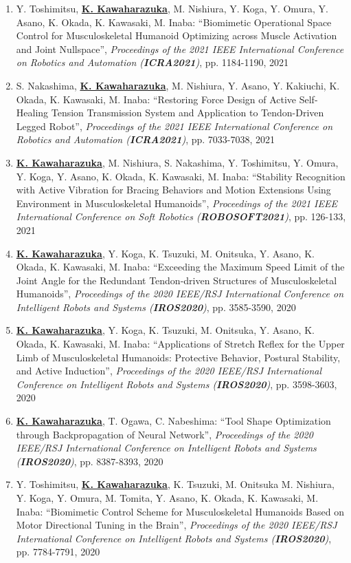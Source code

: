 \documentclass[letterpaper]{article}
\begin{document}
\begin{enumerate}
\item Y. Toshimitsu, \underline{\textbf{K. Kawaharazuka}}, M. Nishiura, Y. Koga, Y. Omura, Y. Asano, K. Okada, K. Kawasaki, M. Inaba: ``Biomimetic Operational Space Control for Musculoskeletal Humanoid Optimizing across Muscle Activation and Joint Nullspace'', \textit{Proceedings of the 2021 IEEE International Conference on Robotics and Automation (\textit{\textbf{ICRA2021}})}, pp. 1184-1190, 2021
\item S. Nakashima, \underline{\textbf{K. Kawaharazuka}}, M. Nishiura, Y. Asano, Y. Kakiuchi, K. Okada, K. Kawasaki, M. Inaba: ``Restoring Force Design of Active Self-Healing Tension Transmission System and Application to Tendon-Driven Legged Robot'', \textit{Proceedings of the 2021 IEEE International Conference on Robotics and Automation (\textit{\textbf{ICRA2021}})}, pp. 7033-7038, 2021
\item \underline{\textbf{K. Kawaharazuka}}, M. Nishiura, S. Nakashima, Y. Toshimitsu, Y. Omura, Y. Koga, Y. Asano, K. Okada, K. Kawasaki, M. Inaba: ``Stability Recognition with Active Vibration for Bracing Behaviors and Motion Extensions Using Environment in Musculoskeletal Humanoids'', \textit{Proceedings of the 2021 IEEE International Conference on Soft Robotics (\textit{\textbf{ROBOSOFT2021}})}, pp. 126-133, 2021
\item \underline{\textbf{K. Kawaharazuka}}, Y. Koga, K. Tsuzuki, M. Onitsuka, Y. Asano, K. Okada, K. Kawasaki, M. Inaba: ``Exceeding the Maximum Speed Limit of the Joint Angle for the Redundant Tendon-driven Structures of Musculoskeletal Humanoids'', \textit{Proceedings of the 2020 IEEE/RSJ International Conference on Intelligent Robots and Systems (\textit{\textbf{IROS2020}})}, pp. 3585-3590, 2020
\item \underline{\textbf{K. Kawaharazuka}}, Y. Koga, K. Tsuzuki, M. Onitsuka, Y. Asano, K. Okada, K. Kawasaki, M. Inaba: ``Applications of Stretch Reflex for the Upper Limb of Musculoskeletal Humanoids: Protective Behavior, Postural Stability, and Active Induction'', \textit{Proceedings of the 2020 IEEE/RSJ International Conference on Intelligent Robots and Systems (\textit{\textbf{IROS2020}})}, pp. 3598-3603, 2020
\item \underline{\textbf{K. Kawaharazuka}}, T. Ogawa, C. Nabeshima: ``Tool Shape Optimization through Backpropagation of Neural Network'', \textit{Proceedings of the 2020 IEEE/RSJ International Conference on Intelligent Robots and Systems (\textit{\textbf{IROS2020}})}, pp. 8387-8393, 2020
\item Y. Toshimitsu, \underline{\textbf{K. Kawaharazuka}}, K. Tsuzuki, M. Onitsuka M. Nishiura, Y. Koga, Y. Omura, M. Tomita, Y. Asano, K. Okada, K. Kawasaki, M. Inaba: ``Biomimetic Control Scheme for Musculoskeletal Humanoids Based on Motor Directional Tuning in the Brain'', \textit{Proceedings of the 2020 IEEE/RSJ International Conference on Intelligent Robots and Systems (\textit{\textbf{IROS2020}})}, pp. 7784-7791, 2020

\end{enumerate}
\end{document}
